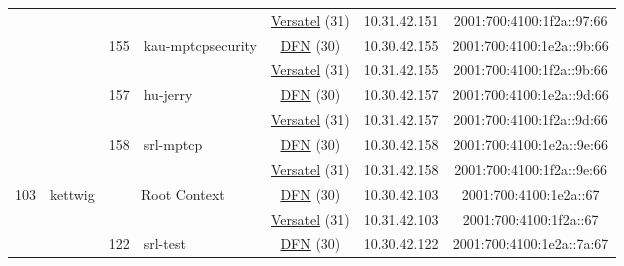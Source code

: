 \begin{small}
\begin{center}
\begin{longtable}{|c|c|c|c|c|c|c|c|}
  &  &  &  & \multicolumn{2}{|c|}{\tiny{\href{http://www.versatel.de}{Versatel} (31)}} & \tiny{10.31.42.151} & \tiny{2001:700:4100:1f2a::97:66} \\* \cline{3-3}\cline{4-4}\cline{5-5}\cline{6-6}\cline{7-7}\cline{8-8}
  &  & \multirow{2}{*}{\tiny{155}} & \multicolumn{1}{|l|}{\multirow{2}{*}{\tiny{kau-mptcpsecurity}}} & \multicolumn{2}{|c|}{\tiny{\href{https://www.dfn.de}{DFN} (30)}} & \tiny{10.30.42.155} & \tiny{2001:700:4100:1e2a::9b:66} \\* \cline{5-5}\cline{6-6}\cline{7-7}\cline{8-8}
  &  &  &  & \multicolumn{2}{|c|}{\tiny{\href{http://www.versatel.de}{Versatel} (31)}} & \tiny{10.31.42.155} & \tiny{2001:700:4100:1f2a::9b:66} \\* \cline{3-3}\cline{4-4}\cline{5-5}\cline{6-6}\cline{7-7}\cline{8-8}
  &  & \multirow{2}{*}{\tiny{157}} & \multicolumn{1}{|l|}{\multirow{2}{*}{\tiny{hu-jerry}}} & \multicolumn{2}{|c|}{\tiny{\href{https://www.dfn.de}{DFN} (30)}} & \tiny{10.30.42.157} & \tiny{2001:700:4100:1e2a::9d:66} \\* \cline{5-5}\cline{6-6}\cline{7-7}\cline{8-8}
  &  &  &  & \multicolumn{2}{|c|}{\tiny{\href{http://www.versatel.de}{Versatel} (31)}} & \tiny{10.31.42.157} & \tiny{2001:700:4100:1f2a::9d:66} \\* \cline{3-3}\cline{4-4}\cline{5-5}\cline{6-6}\cline{7-7}\cline{8-8}
  &  & \multirow{2}{*}{\tiny{158}} & \multicolumn{1}{|l|}{\multirow{2}{*}{\tiny{srl-mptcp}}} & \multicolumn{2}{|c|}{\tiny{\href{https://www.dfn.de}{DFN} (30)}} & \tiny{10.30.42.158} & \tiny{2001:700:4100:1e2a::9e:66} \\* \cline{5-5}\cline{6-6}\cline{7-7}\cline{8-8}
  &  &  &  & \multicolumn{2}{|c|}{\tiny{\href{http://www.versatel.de}{Versatel} (31)}} & \tiny{10.31.42.158} & \tiny{2001:700:4100:1f2a::9e:66} \\ \hline
 \multirow{22}{*}{\tiny{103}} & \multicolumn{1}{|l|}{\multirow{22}{*}{\tiny{kettwig}}} & \multicolumn{2}{|c|}{\multirow{2}{*}{\tiny{Root Context}}} & \multicolumn{2}{|c|}{\tiny{\href{https://www.dfn.de}{DFN} (30)}} & \tiny{10.30.42.103} & \tiny{2001:700:4100:1e2a::67} \\* \cline{5-5}\cline{6-6}\cline{7-7}\cline{8-8}
  &  & \multicolumn{2}{|c|}{} & \multicolumn{2}{|c|}{\tiny{\href{http://www.versatel.de}{Versatel} (31)}} & \tiny{10.31.42.103} & \tiny{2001:700:4100:1f2a::67} \\* \cline{3-3}\cline{4-4}\cline{5-5}\cline{6-6}\cline{7-7}\cline{8-8}
  &  & \multirow{2}{*}{\tiny{122}} & \multicolumn{1}{|l|}{\multirow{2}{*}{\tiny{srl-test}}} & \multicolumn{2}{|c|}{\tiny{\href{https://www.dfn.de}{DFN} (30)}} & \tiny{10.30.42.122} & \tiny{2001:700:4100:1e2a::7a:67} \\* \cline{5-5}\cline{6-6}\cline{7-7}\cline{8-8}

\end{longtable}
\end{center}
\end{small}
